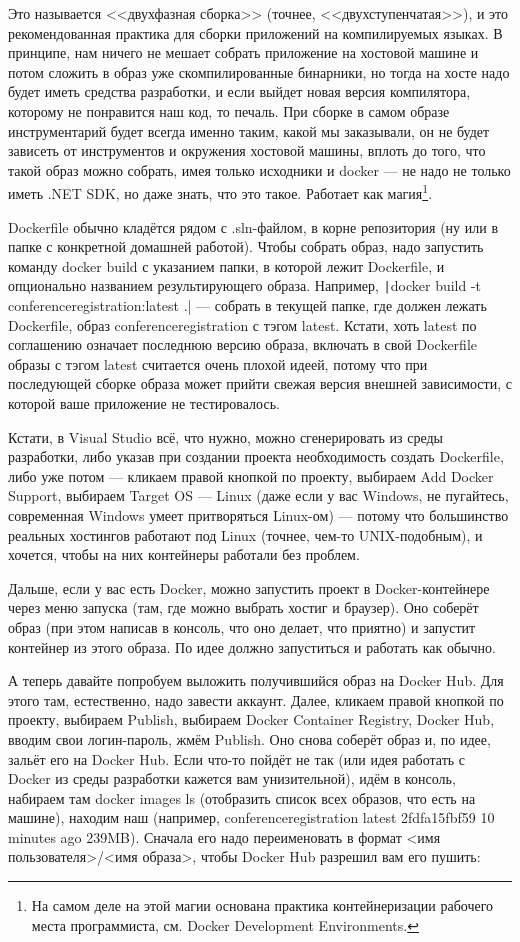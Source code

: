 \documentclass{../../text-style}
\begin{document}
Это называется <<двухфазная сборка>> (точнее, <<двухступенчатая>>), и это рекомендованная практика для сборки приложений на компилируемых языках. В принципе, нам ничего не мешает собрать приложение на хостовой машине и потом сложить в образ уже скомпилированные бинарники, но тогда на хосте надо будет иметь средства разработки, и если выйдет новая версия компилятора, которому не понравится наш код, то печаль. При сборке в самом образе инструментарий будет всегда именно таким, какой мы заказывали, он не будет зависеть от инструментов и окружения хостовой машины, вплоть до того, что такой образ можно собрать, имея только исходники и docker --- не надо не только иметь .NET SDK, но даже знать, что это такое. Работает как магия\footnote{На самом деле на этой магии основана практика контейнеризации рабочего места программиста, см. Docker Development Environments.}.

Dockerfile обычно кладётся рядом с .sln-файлом, в корне репозитория (ну или в папке с конкретной домашней работой). Чтобы собрать образ, надо запустить команду docker build с указанием папки, в которой лежит Dockerfile, и опционально названием результирующего образа. Например, \texttt|docker build -t conferenceregistration:latest .| --- собрать в текущей папке, где должен лежать Dockerfile, образ conferenceregistration с тэгом latest. Кстати, хоть latest по соглашению означает последнюю версию образа, включать в свой Dockerfile образы с тэгом latest считается очень плохой идеей, потому что при последующей сборке образа может прийти свежая версия внешней зависимости, с которой ваше приложение не тестировалось.

Кстати, в Visual Studio всё, что нужно, можно сгенерировать из среды разработки, либо указав при создании проекта необходимость создать Dockerfile, либо уже потом --- кликаем правой кнопкой по проекту, выбираем Add Docker Support, выбираем Target OS --- Linux (даже если у вас Windows, не пугайтесь, современная Windows умеет притворяться Linux-ом) --- потому что большинство реальных хостингов работают под Linux (точнее, чем-то UNIX-подобным), и хочется, чтобы на них контейнеры работали без проблем.

Дальше, если у вас есть Docker, можно запустить проект в Docker-контейнере через меню запуска (там, где можно выбрать хостиг и браузер). Оно соберёт образ (при этом написав в консоль, что оно делает, что приятно) и запустит контейнер из этого образа. По идее должно запуститься и работать как обычно.

А теперь давайте попробуем выложить получившийся образ на Docker Hub. Для этого там, естественно, надо завести аккаунт. Далее, кликаем правой кнопкой по проекту, выбираем Publish, выбираем Docker Container Registry, Docker Hub, вводим свои логин-пароль, жмём Publish. Оно снова соберёт образ и, по идее, зальёт его на Docker Hub. Если что-то пойдёт не так (или идея работать с Docker из среды разработки кажется вам унизительной), идём в консоль, набираем там docker images ls (отобразить список всех образов, что есть на машине), находим наш (например, conferenceregistration latest 2fdfa15fbf59 10 minutes ago 239MB). Сначала его надо переименовать в формат <имя пользователя>/<имя образа>, чтобы Docker Hub разрешил вам его пушить:
\end{document}
